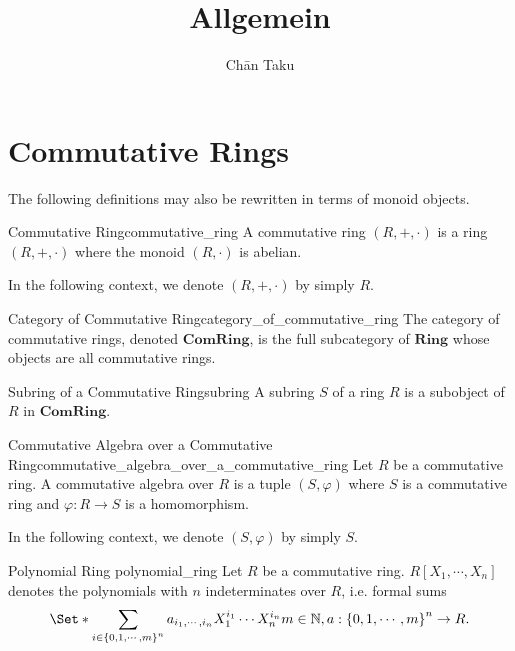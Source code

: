 \documentclass{article}
\title{Allgemein}
\author{Ch\=an Taku}
\begin{document}
\maketitle

\section{Commutative Rings}

The following definitions may also be rewritten in terms of monoid objects.

\begin{definition}{Commutative Ring}{commutative_ring}
    A commutative ring $(R,+,\cdot)$ is a ring $(R,+,\cdot)$ where the monoid $(R,\cdot)$ is abelian.
\end{definition}

In the following context, we denote $(R,+,\cdot)$ by simply $R$.

\begin{definition}{Category of Commutative Ring}{category_of_commutative_ring}
    The category of commutative rings, denoted $\mathbf{ComRing}$,
    is the full subcategory of $\mathbf{Ring}$ whose objects are all commutative rings.
\end{definition}

\begin{definition}{Subring of a Commutative Ring}{subring}
    A subring $S$ of a ring $R$ is a subobject of $R$ in $\mathbf{ComRing}$.
\end{definition}

\begin{definition}{Commutative Algebra over a Commutative Ring}{commutative_algebra_over_a_commutative_ring}
    Let $R$ be a commutative ring.
    A commutative algebra over $R$ is a tuple $(S,\varphi)$ where $S$ is a commutative ring and $\varphi: R\rightarrow S$ is a homomorphism.
\end{definition}

In the following context, we denote $(S,\varphi)$ by simply $S$.

\begin{definition}{Polynomial Ring }{polynomial_ring}
    Let $R$ be a commutative ring.
    $R[X_1,\cdots,X_n]$ denotes the polynomials with $n$ indeterminates over $R$, i.e. formal sums
    \[ \Set*{\sum_{i\in \qty{0,1,\cdots,m}^n} a_{i_1,\cdots,i_n}X_1^{i_1}\cdots X_n^{i_n}}{m\in \mathbb{N}, a: \qty{0,1,\cdots,m}^n \rightarrow R}. \]
\end{definition}
\end{document}
